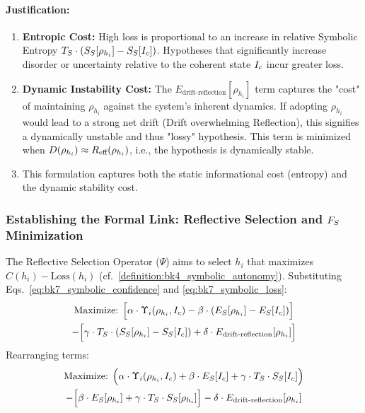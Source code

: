 \paragraph{Justification:}
\begin{enumerate}
    \item \textbf{Entropic Cost:} High loss is proportional to an increase in relative Symbolic Entropy \(T_S \cdot (S_S[\rho_{h_i}] - S_S[I_c])\). Hypotheses that significantly increase disorder or uncertainty relative to the coherent state \(I_c\) incur greater loss.
    \item \textbf{Dynamic Instability Cost:} The \(E_{\text{drift-reflection}}[\rho_{h_i}]\) term captures the "cost" of maintaining \(\rho_{h_i}\) against the system's inherent dynamics. If adopting \(\rho_{h_i}\) would lead to a strong net drift (Drift overwhelming Reflection), this signifies a dynamically unstable and thus "lossy" hypothesis. This term is minimized when \(D(\rho_{h_i}) \approx R_{\text{eff}}(\rho_{h_i})\), i.e., the hypothesis is dynamically stable.
    \item This formulation captures both the static informational cost (entropy) and the dynamic stability cost.
\end{enumerate}
\subsubsection{Establishing the Formal Link: Reflective Selection and \(F_S\) Minimization}
\label{subsubsec:bk7_establishing_the_formal_link_reflective_selection_and_}
The Reflective Selection Operator ($\Psi$) aims to select \(h_i\) that maximizes \(C(h_i) - \text{Loss}(h_i)\) (cf.~\ref{definition:bk4_symbolic_autonomy}).
Substituting Eqs.~\eqref{eq:bk7_symbolic_confidence} and \eqref{eq:bk7_symbolic_loss}:
\begin{multline*}
\text{Maximize: } \Big[ \alpha \cdot \Upsilon_i(\rho_{h_i}, I_c) - \beta \cdot (E_S[\rho_{h_i}] - E_S[I_c]) \Big] \\
- \Big[ \gamma \cdot T_S \cdot (S_S[\rho_{h_i}] - S_S[I_c]) + \delta \cdot E_{\text{drift-reflection}}[\rho_{h_i}] \Big]
\end{multline*}
Rearranging terms:
\begin{multline*}
\text{Maximize: } \Big( \alpha \cdot \Upsilon_i(\rho_{h_i}, I_c) + \beta \cdot E_S[I_c] + \gamma \cdot T_S \cdot S_S[I_c] \Big) \\
- \Big[ \beta \cdot E_S[\rho_{h_i}] + \gamma \cdot T_S \cdot S_S[\rho_{h_i}] \Big] - \delta \cdot E_{\text{drift-reflection}}[\rho_{h_i}]
\end{multline*}
